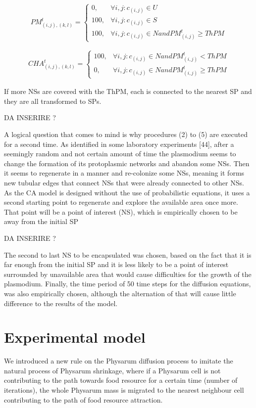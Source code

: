 \begin{equation}
PM^t_{(i, j),(k,l)}=
\begin{cases} 
0, & \forall i, j: c_{(i,j)} \in U \\ 
100, & \forall i, j: c_{(i,j)} \in S \\ 
100, & \forall i, j: c_{(i,j)} \in N and  PM^t_{(i, j)} \geq ThPM 
\end{cases}
\end{equation}

\begin{align}
CHA^t_{(i, j),(k,l)}=
\begin{cases} 
100, & \forall i, j: c_{(i,j)} \in N and PM^t_{(i, j)} < ThPM\\ 
0, & \forall i, j: c_{(i,j)} \in N and  PM^t_{(i, j)} \geq ThPM 
\end{cases}
\end{align}

If more NSs are covered with the ThPM, each is connected to the nearest SP and they are all transformed to SPs. 

\par
DA INSERIRE ?
\par
 A logical question that comes to mind is why procedures (2) to (5) are executed
for a second time. As identified in some laboratory experiments [44], after a seemingly
random and not certain amount of time the plasmodium seems to change the
formation of its protoplasmic networks and abandon some NSs. Then it seems to
regenerate in a manner and re-colonize some NSs, meaning it forms new tubular
edges that connect NSs that were already connected to other NSs. As the CA model
is designed without the use of probabilistic equations, it uses a second starting point
to regenerate and explore the available area once more. That point will be a point of
interest (NS), which is empirically chosen to be away from the initial SP
\par
DA INSERIRE ?
\par 
The second to last NS to
be encapsulated was chosen, based on the fact that it is far enough from the initial
SP and it is less likely to be a point of interest surrounded by unavailable area that
would cause difficulties for the growth of the plasmodium. Finally, the time period
of 50 time steps for the diffusion equations, was also empirically chosen, although
the alternation of that will cause little difference to the results of the model.

\section{Experimental model}

We introduced a new rule on the Physarum diffusion process to imitate the natural process of Physarum shrinkage, where
if a Physarum cell is not contributing to the path towards food resource for a certain time (number of iterations), the whole Physarum mass is migrated to the nearest neighbour cell contributing to the path of food resource attraction.
